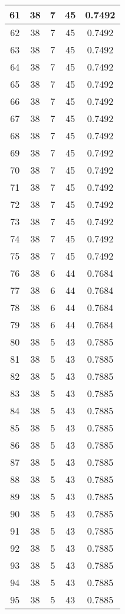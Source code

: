 \documentclass[letterpaper, 12pt]{article}
\begin{document}
\begin{longtable}{|c|c|c|c|c|}
61 & 38 & 7 & 45 & 0.7492 \\
\hline
62 & 38 & 7 & 45 & 0.7492 \\
\hline
63 & 38 & 7 & 45 & 0.7492 \\
\hline
64 & 38 & 7 & 45 & 0.7492 \\
\hline
65 & 38 & 7 & 45 & 0.7492 \\
\hline
66 & 38 & 7 & 45 & 0.7492 \\
\hline
67 & 38 & 7 & 45 & 0.7492 \\
\hline
68 & 38 & 7 & 45 & 0.7492 \\
\hline
69 & 38 & 7 & 45 & 0.7492 \\
\hline
70 & 38 & 7 & 45 & 0.7492 \\
\hline
71 & 38 & 7 & 45 & 0.7492 \\
\hline
72 & 38 & 7 & 45 & 0.7492 \\
\hline
73 & 38 & 7 & 45 & 0.7492 \\
\hline
74 & 38 & 7 & 45 & 0.7492 \\
\hline
75 & 38 & 7 & 45 & 0.7492 \\
\hline
76 & 38 & 6 & 44 & 0.7684 \\
\hline
77 & 38 & 6 & 44 & 0.7684 \\
\hline
78 & 38 & 6 & 44 & 0.7684 \\
\hline
79 & 38 & 6 & 44 & 0.7684 \\
\hline
80 & 38 & 5 & 43 & 0.7885 \\
\hline
81 & 38 & 5 & 43 & 0.7885 \\
\hline
82 & 38 & 5 & 43 & 0.7885 \\
\hline
83 & 38 & 5 & 43 & 0.7885 \\
\hline
84 & 38 & 5 & 43 & 0.7885 \\
\hline
85 & 38 & 5 & 43 & 0.7885 \\
\hline
86 & 38 & 5 & 43 & 0.7885 \\
\hline
87 & 38 & 5 & 43 & 0.7885 \\
\hline
88 & 38 & 5 & 43 & 0.7885 \\
\hline
89 & 38 & 5 & 43 & 0.7885 \\
\hline
90 & 38 & 5 & 43 & 0.7885 \\
\hline
91 & 38 & 5 & 43 & 0.7885 \\
\hline
92 & 38 & 5 & 43 & 0.7885 \\
\hline
93 & 38 & 5 & 43 & 0.7885 \\
\hline
94 & 38 & 5 & 43 & 0.7885 \\
\hline
95 & 38 & 5 & 43 & 0.7885 \\

\end{longtable}
\end{document}
